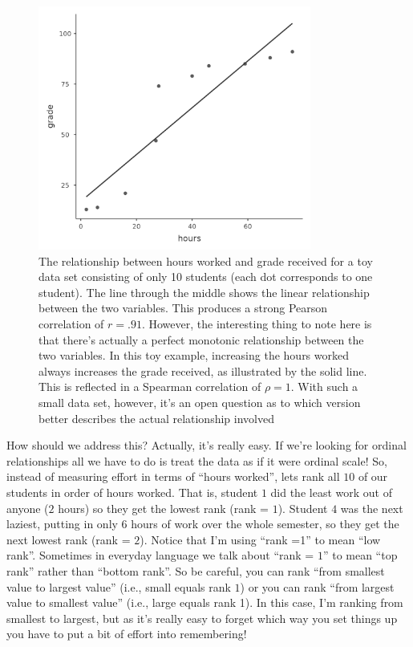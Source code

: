 \documentclass[
  a4paper,
]{book}
\begin{document}
\begin{figure}[h!]

\includegraphics[width=0.8\textwidth,height=\textheight]{images/fig12-7.png} \hfill{}

\caption{\label{fig-fig12-7}The relationship between hours worked and
grade received for a toy data set consisting of only 10 students (each
dot corresponds to one student). The line through the middle shows the
linear relationship between the two variables. This produces a strong
Pearson correlation of \(r = .91\). However, the interesting thing to
note here is that there's actually a perfect monotonic relationship
between the two variables. In this toy example, increasing the hours
worked always increases the grade received, as illustrated by the solid
line. This is reflected in a Spearman correlation of \(\rho = 1\). With
such a small data set, however, it's an open question as to which
version better describes the actual relationship involved}

\end{figure}

How should we address this? Actually, it's really easy. If we're looking
for ordinal relationships all we have to do is treat the data as if it
were ordinal scale! So, instead of measuring effort in terms of ``hours
worked'', lets rank all \(10\) of our students in order of hours worked.
That is, student \(1\) did the least work out of anyone (\(2\) hours) so
they get the lowest rank (rank = \(1\)). Student \(4\) was the next
laziest, putting in only \(6\) hours of work over the whole semester, so
they get the next lowest rank (rank = \(2\)). Notice that I'm using
``rank =1'' to mean ``low rank''. Sometimes in everyday language we talk
about ``rank = \(1\)'' to mean ``top rank'' rather than ``bottom rank''.
So be careful, you can rank ``from smallest value to largest value''
(i.e., small equals rank \(1\)) or you can rank ``from largest value to
smallest value'' (i.e., large equals rank 1). In this case, I'm ranking
from smallest to largest, but as it's really easy to forget which way
you set things up you have to put a bit of effort into remembering!
\end{document}
